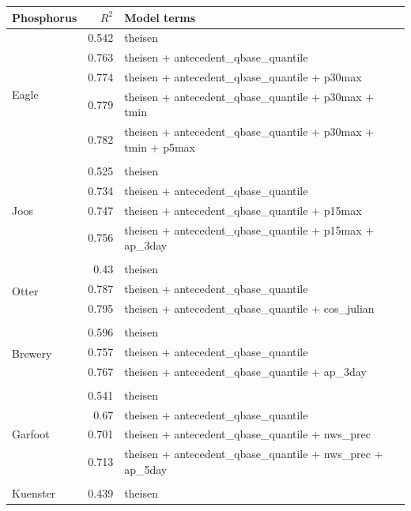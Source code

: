 \documentclass[10pt]{article}
\begin{document}
\begin{table}[h] \small
    \begin{center}
    \begin{tabular}{lrl}
    \textbf{Phosphorus} & $R^2$ & Model terms \\
    \hline
\multirow{6}{*}{Eagle} & 0.542 & theisen\\ 
 & 0.763 & theisen + antecedent\_qbase\_quantile\\ 
 & 0.774 & theisen + antecedent\_qbase\_quantile + p30max\\ 
 & 0.779 & theisen + antecedent\_qbase\_quantile + p30max + tmin\\ 
 & 0.782 & theisen + antecedent\_qbase\_quantile + p30max + tmin + p5max\\ 
\vspace{2mm}\\ \multirow{5}{*}{Joos} & 0.525 & theisen\\ 
 & 0.734 & theisen + antecedent\_qbase\_quantile\\ 
 & 0.747 & theisen + antecedent\_qbase\_quantile + p15max\\ 
 & 0.756 & theisen + antecedent\_qbase\_quantile + p15max + ap\_3day\\ 
\vspace{2mm}\\ \multirow{4}{*}{Otter} & 0.43 & theisen\\ 
 & 0.787 & theisen + antecedent\_qbase\_quantile\\ 
 & 0.795 & theisen + antecedent\_qbase\_quantile + cos\_julian\\ 
\vspace{2mm}\\ \multirow{4}{*}{Brewery} & 0.596 & theisen\\ 
 & 0.757 & theisen + antecedent\_qbase\_quantile\\ 
 & 0.767 & theisen + antecedent\_qbase\_quantile + ap\_3day\\ 
\vspace{2mm}\\ \multirow{5}{*}{Garfoot} & 0.541 & theisen\\ 
 & 0.67 & theisen + antecedent\_qbase\_quantile\\ 
 & 0.701 & theisen + antecedent\_qbase\_quantile + nws\_prec\\ 
 & 0.713 & theisen + antecedent\_qbase\_quantile + nws\_prec + ap\_5day\\ 
\vspace{2mm}\\ \multirow{4}{*}{Kuenster} & 0.439 & theisen\\ 

\end{tabular}
\end{center}
\end{table}
\end{document}
